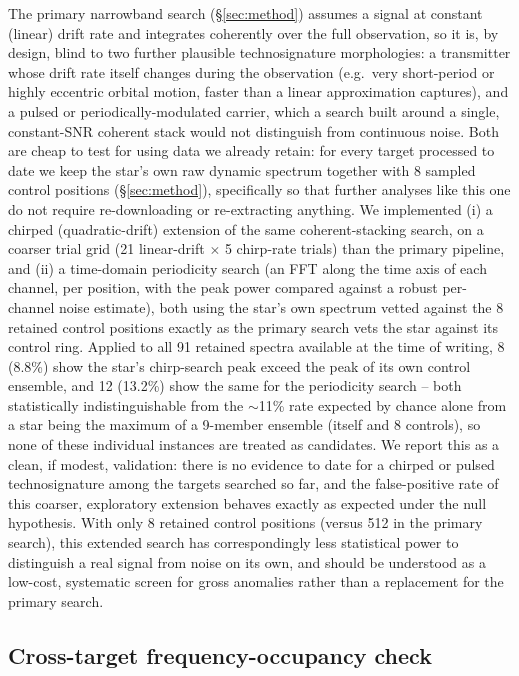 \documentclass{openjournal}
\begin{document}
The primary narrowband search (\S\ref{sec:method}) assumes a signal at
constant (linear) drift rate and integrates coherently over the full
observation, so it is, by design, blind to two further plausible
technosignature morphologies: a transmitter whose drift rate itself
changes during the observation (e.g.\ very short-period or highly
eccentric orbital motion, faster than a linear approximation captures),
and a pulsed or periodically-modulated carrier, which a search built
around a single, constant-SNR coherent stack would not distinguish from
continuous noise. Both are cheap to test for using data we already
retain: for every target processed to date we keep the star's own raw
dynamic spectrum together with 8 sampled control positions
(\S\ref{sec:method}), specifically so that further analyses like this
one do not require re-downloading or re-extracting anything. We
implemented (i) a chirped (quadratic-drift) extension of the same
coherent-stacking search, on a coarser trial grid (21 linear-drift $\times$
5 chirp-rate trials) than the primary pipeline, and (ii) a time-domain
periodicity search (an FFT along the time axis of each channel, per
position, with the peak power compared against a robust per-channel
noise estimate), both using the star's own spectrum vetted against the 8
retained control positions exactly as the primary search vets the star
against its control ring. Applied to all 91 retained spectra available
at the time of writing, 8 (8.8\%) show the star's chirp-search peak
exceed the peak of its own control ensemble, and 12 (13.2\%) show the same
for the periodicity search -- both statistically indistinguishable from
the $\sim$11\% rate expected by chance alone from a star being the
maximum of a 9-member ensemble (itself and 8 controls), so none of these
individual instances are treated as candidates. We report this as a
clean, if modest, validation: there is no evidence to date for a
chirped or pulsed technosignature among the targets searched so far,
and the false-positive rate of this coarser, exploratory extension
behaves exactly as expected under the null hypothesis. With only 8
retained control positions (versus 512 in the primary search), this
extended search has correspondingly less statistical power to
distinguish a real signal from noise on its own, and should be
understood as a low-cost, systematic screen for gross anomalies rather
than a replacement for the primary search.

\subsection{Cross-target frequency-occupancy check}
\label{sec:freqoccupancy}
\end{document}
